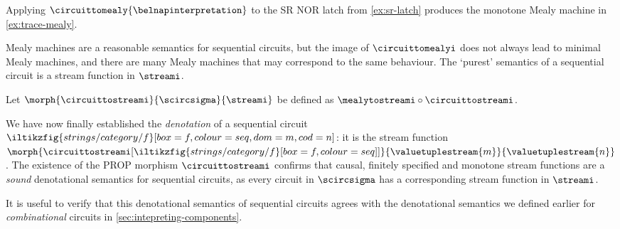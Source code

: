 

\begin{example}\label{ex:mealy-translation}
    Applying \(\circuittomealy{\belnapinterpretation}\) to the SR NOR latch from
    \cref{ex:sr-latch} produces the monotone Mealy machine in
    \cref{ex:trace-mealy}.
\end{example}

Mealy machines are a reasonable semantics for sequential circuits, but the
image of \(\circuittomealyi\) does not always lead to minimal Mealy machines,
and there are many Mealy machines that may correspond to the same behaviour.
The `purest' semantics of a sequential circuit is a stream function in
\(\streami\).

\begin{definition}
    Let \(\morph{\circuittostreami}{\scircsigma}{\streami}\) be defined as
    \(\mealytostreami \circ \circuittostreami\).
\end{definition}

We have now finally established the \emph{denotation} of a sequential circuit \(
\iltikzfig{strings/category/f}[box=f,colour=seq,dom=m,cod=n]
\): it is the stream function \(
\morph{\circuittostreami[\iltikzfig{strings/category/f}[box=f,colour=seq]]}{\valuetuplestream{m}}{\valuetuplestream{n}}
\).
The existence of the PROP morphism \(\circuittostreami\) confirms that causal,
finitely specified and monotone stream functions are a \emph{sound} denotational
semantics for sequential circuits, as every circuit in \(\scircsigma\) has a
corresponding stream function in \(\streami\).

It is useful to verify that this denotational semantics of sequential circuits
agrees with the denotational semantics we defined earlier for
\emph{combinational} circuits in \cref{sec:intepreting-components}.

